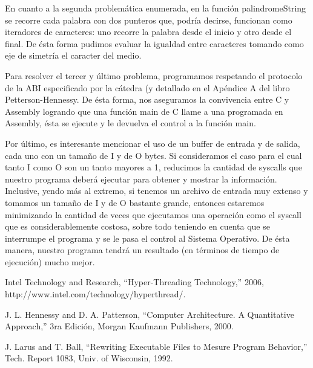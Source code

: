 \documentclass[a4paper,10pt]{article}
\begin{document}
\indent	
	En cuanto a la segunda problemática enumerada, en la función palindromeString se recorre cada palabra con dos punteros que, podría decirse, funcionan como iteradores de caracteres: uno recorre la palabra desde el inicio y otro desde el final. De ésta forma pudimos evaluar la igualdad entre caracteres tomando como eje de simetría el caracter del medio.

\indent	
	Para resolver el tercer y último problema, programamos respetando el protocolo de la ABI especificado por la cátedra (y detallado en el Apéndice A del libro Petterson-Hennessy. De ésta forma, nos aseguramos la convivencia entre C y Assembly logrando que una función main de C llame a una programada en Assembly, ésta se ejecute y le devuelva el control a la función main.

\indent	
	Por último, es interesante mencionar el uso de un buffer de entrada y de salida, cada uno con un tamaño de I y de O bytes. Si consideramos el caso para el cual tanto I como O son un tanto mayores a 1, reducimos la cantidad de syscalls que nuestro programa deberá ejecutar para obtener y mostrar la información. Inclusive, yendo más al extremo, si tenemos un archivo de entrada muy extenso y tomamos un tamaño de I y de O bastante grande, entonces estaremos minimizando la cantidad de veces que ejecutamos una operación como el syscall que es considerablemente costosa, sobre todo teniendo en cuenta que se interrumpe el programa y se le pasa el control al Sistema Operativo. De ésta manera, nuestro programa tendrá un resultado (en términos de tiempo de ejecución) mucho mejor.
	
\begin{thebibliography}{99}

 Intel Technology and Research, ``Hyper-Threading Technology,'' 2006, http://www.intel.com/technology/hyperthread/.

 J. L. Hennessy and D. A. Patterson, ``Computer Architecture. A Quantitative
Approach,'' 3ra Edición, Morgan Kaufmann Publishers, 2000.

 J. Larus and T. Ball, ``Rewriting Executable Files to Mesure Program Behavior,'' Tech. Report 1083, Univ. of Wisconsin, 1992.

\end{thebibliography}
\end{document}
